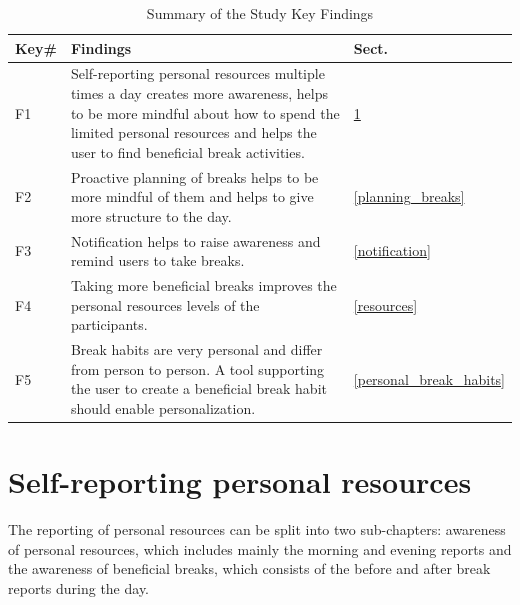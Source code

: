 \documentclass{hasel_thesis}
\begin{document}
\begin{table}[ht]
 \caption{Summary of the Study Key Findings}
    \begin{tabular}{ |p{1cm} p{12cm} p{1cm}|  }
    \hline
     Key\# & Findings & Sect.\\
     \hline
     \rowcolor{Gray}
     F1 &   Self-reporting personal resources multiple times a day creates more awareness, helps to be more mindful about how to spend the limited personal resources and helps the user to find beneficial break activities. & \ref{self-reporting} \\
     F2 &   Proactive planning of breaks helps to be more mindful of them and helps to give more structure to the day. & \ref{planning_breaks}\\
     \rowcolor{Gray}
     F3 &   Notification helps to raise awareness and remind users to take breaks. & \ref{notification} \\
     F4 &   Taking more beneficial breaks improves the personal resources levels of the participants. & \ref{resources} \\
     \rowcolor{Gray}
     F5 &   Break habits are very personal and differ from person to person. A tool supporting the user to create a beneficial break habit should enable personalization. & \ref{personal_break_habits} \\
     
     \hline
     
    \end{tabular}
 \label{table:key_findings}
\end{table}

\section{Self-reporting personal resources} \label{self-reporting}

The reporting of personal resources can be split into two sub-chapters: awareness of personal resources, which includes mainly the morning and evening reports and the awareness of beneficial breaks, which consists of the before and after break reports during the day.
\end{document}
